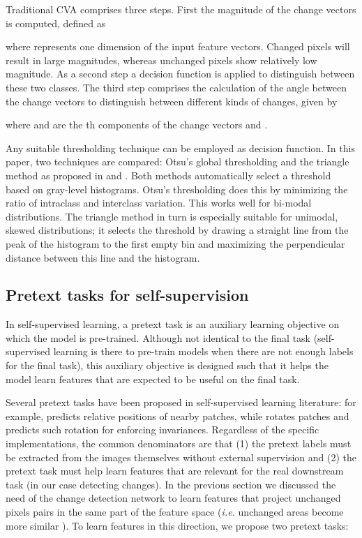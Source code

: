 \documentclass[runningheads]{llncs}
\begin{document}
Traditional \ac{CVA} comprises three steps. First the magnitude  of the change vectors is computed, defined as  

where  represents one dimension of the input feature vectors. Changed pixels will result in large magnitudes, whereas unchanged pixels show relatively low magnitude. As a second step a decision function is applied to distinguish between these two classes. The third step comprises the calculation of the angle between the change vectors to distinguish between different kinds of changes, given by 

where  and  are the th components of the change vectors  and  \cite{Bovolo:2007:CVA_polar}.

Any suitable thresholding technique can be employed as decision function. In this paper, two techniques are compared: Otsu's global thresholding \cite{Otsu:1979:threshold} and the triangle method as proposed in \cite{Zack:1977:triangle_threshold} and \cite{Rosin:2001:triangle}. Both methods automatically select a threshold based on gray-level histograms. Otsu's thresholding does this by minimizing the ratio of intraclass and interclass variation. This works well for bi-modal distributions. The triangle method in turn is especially suitable for unimodal, skewed distributions; it selects the threshold by drawing a straight line from the peak of the histogram to the first empty bin and maximizing the perpendicular distance between this line and the histogram.
\fi 

\subsection{Pretext tasks for self-supervision}\label{sec:ssl} \label{sec:pretext_tasks}
{In self-supervised learning, a pretext task is an auxiliary learning objective on which the model is pre-trained. Although not identical to the final task (self-supervised learning is there to pre-train models when there are not enough labels for the final task), this auxiliary objective is designed such that it helps the model learn features that are expected to be useful on the final task.}


Several pretext tasks have been proposed in self-supervised learning literature{: for example, \cite{Doersch:2015:self-supervised_spatial_context}  predicts relative positions of nearby patches, while \cite{Gidaris:2018:self-supervised_rotation} rotates patches and predicts such rotation for enforcing invariances. Regardless of the specific implementations,} the common  denominators are that (1) the pretext labels must be extracted from the images themselves without external supervision and (2) the pretext task must help learn features that are relevant for the real downstream task (in our case detecting changes). In the previous section we discussed the need of the change detection network to learn features that project unchanged pixels pairs in the same part of the feature space (\emph{i.e.} unchanged areas become more similar \cite{Vol14b}).
To learn features in this direction, we propose two pretext tasks: 
\end{document}

